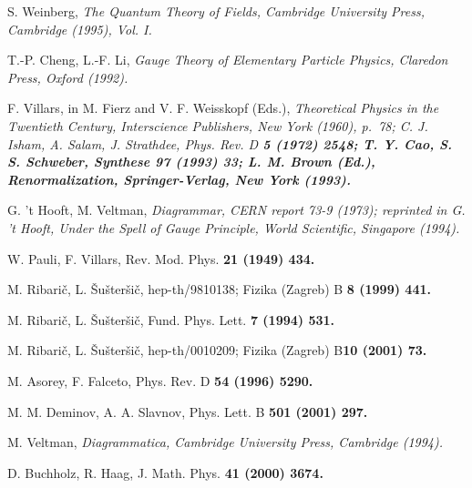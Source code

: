 \documentclass[a4paper,12pt]{article}
\begin{document}
\vfill\eject
\begin{thebibliography}{99}

S. Weinberg, \it The Quantum Theory of Fields, \rm Cambridge University Press, Cambridge (1995), Vol. I.

T.-P. Cheng, L.-F. Li, \it Gauge Theory of Elementary Particle Physics, \rm Claredon Press, Oxford (1992).

F. Villars, in M. Fierz and V. F. Weisskopf (Eds.), \it Theoretical Physics in the Twentieth Century, \rm Interscience Publishers, New York (1960), p.~78; C. J. Isham, A. Salam, J. Strathdee, Phys. Rev. D \bf 5 \rm (1972) 2548;  T. Y. Cao, S. S. Schweber, Synthese \bf 97 \rm (1993) 33; L. M. Brown (Ed.), \it Renormalization, \rm Springer-Verlag, New York (1993).

G. 't Hooft, M. Veltman, \it Diagrammar, \rm CERN report 73-9 (1973); reprinted in G. 't Hooft, \it Under the Spell of  Gauge Principle, \rm World Scientific, Singapore (1994).

W. Pauli, F. Villars, Rev. Mod. Phys. \bf 21 \rm (1949) 434.

M. Ribari\v c, L. \v Su\v ster\v si\v c, hep-th/9810138; Fizika (Zagreb) B \bf 8 \rm (1999) 441.

M. Ribari\v c, L. \v Su\v ster\v si\v c, Fund. Phys. Lett. \bf 7 \rm (1994) 531.

M. Ribari\v c, L. \v Su\v ster\v si\v c, hep-th/0010209; Fizika (Zagreb) B\bf 10 \rm (2001) 73.

M. Asorey, F. Falceto, Phys. Rev. D \bf 54 \rm (1996) 5290.

M. M. Deminov, A. A. Slavnov, Phys. Lett. B \bf 501 \rm (2001) 297.

M. Veltman, \it Diagrammatica, \rm Cambridge University Press, Cambridge (1994).

D. Buchholz, R. Haag, J. Math. Phys. \bf 41 \rm (2000) 3674.

\end{thebibliography}
\end{document}
